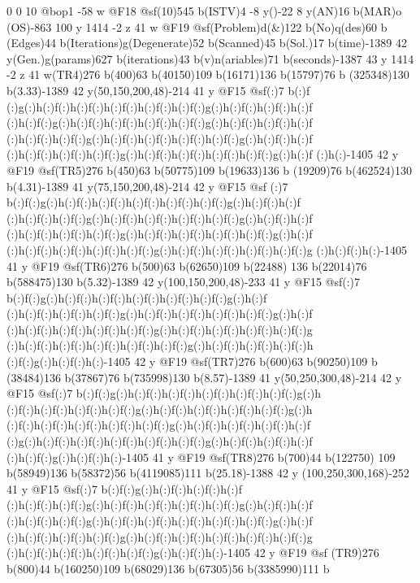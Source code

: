{{{{{{{{{{{{{{{{{{{{{{{{{{{{{{{{{{{{{{{{{{{{{{{{{{{{{{{{{{{{{{{{{{{{{0 0 10 @bop1 -58 w @F18 @sf(10)545 b(ISTV)4 -8 y()-22 8 y(AN)16 b(MAR)o
(OS)-863 100 y 1414 -2 z 41 w @F19 @sf(Problem)d(&)122 b(No)q(des)60 b
(Edges)44 b(Iterations)g(Degenerate)52 b(Scanned)45 b(Sol.)17 b(time)-1389 
42 y(Gen.)g(params)627 b(iterations)43 b(v)n(ariables)71 b(seconds)-1387 
43 y 1414 -2 z 41 w(TR4)276 b(400)63 b(40150)109 b(16171)136 b(15797)76 b
(325348)130 b(3.33)-1389 42 y(50,150,200,48)-214 41 y @F15 @sf(:)7 b(:)f
(:)g(:)h(:)f(:)h(:)f(:)h(:)f(:)h(:)f(:)h(:)f(:)g(:)h(:)f(:)h(:)f(:)h(:)f
(:)h(:)f(:)g(:)h(:)f(:)h(:)f(:)h(:)f(:)h(:)f(:)g(:)h(:)f(:)h(:)f(:)h(:)f
(:)h(:)f(:)h(:)f(:)g(:)h(:)f(:)h(:)f(:)h(:)f(:)h(:)f(:)g(:)h(:)f(:)h(:)f
(:)h(:)f(:)h(:)f(:)h(:)f(:)g(:)h(:)f(:)h(:)f(:)h(:)f(:)h(:)f(:)g(:)h(:)f
(:)h(:)-1405 42 y @F19 @sf(TR5)276 b(450)63 b(50775)109 b(19633)136 b
(19209)76 b(462524)130 b(4.31)-1389 41 y(75,150,200,48)-214 42 y @F15 @sf
(:)7 b(:)f(:)g(:)h(:)f(:)h(:)f(:)h(:)f(:)h(:)f(:)h(:)f(:)g(:)h(:)f(:)h(:)f
(:)h(:)f(:)h(:)f(:)g(:)h(:)f(:)h(:)f(:)h(:)f(:)h(:)f(:)g(:)h(:)f(:)h(:)f
(:)h(:)f(:)h(:)f(:)h(:)f(:)g(:)h(:)f(:)h(:)f(:)h(:)f(:)h(:)f(:)g(:)h(:)f
(:)h(:)f(:)h(:)f(:)h(:)f(:)h(:)f(:)g(:)h(:)f(:)h(:)f(:)h(:)f(:)h(:)f(:)g
(:)h(:)f(:)h(:)-1405 41 y @F19 @sf(TR6)276 b(500)63 b(62650)109 b(22488)
136 b(22014)76 b(588475)130 b(5.32)-1389 42 y(100,150,200,48)-233 41 y 
@F15 @sf(:)7 b(:)f(:)g(:)h(:)f(:)h(:)f(:)h(:)f(:)h(:)f(:)h(:)f(:)g(:)h(:)f
(:)h(:)f(:)h(:)f(:)h(:)f(:)g(:)h(:)f(:)h(:)f(:)h(:)f(:)h(:)f(:)g(:)h(:)f
(:)h(:)f(:)h(:)f(:)h(:)f(:)h(:)f(:)g(:)h(:)f(:)h(:)f(:)h(:)f(:)h(:)f(:)g
(:)h(:)f(:)h(:)f(:)h(:)f(:)h(:)f(:)h(:)f(:)g(:)h(:)f(:)h(:)f(:)h(:)f(:)h
(:)f(:)g(:)h(:)f(:)h(:)-1405 42 y @F19 @sf(TR7)276 b(600)63 b(90250)109 b
(38484)136 b(37867)76 b(735998)130 b(8.57)-1389 41 y(50,250,300,48)-214 
42 y @F15 @sf(:)7 b(:)f(:)g(:)h(:)f(:)h(:)f(:)h(:)f(:)h(:)f(:)h(:)f(:)g(:)h
(:)f(:)h(:)f(:)h(:)f(:)h(:)f(:)g(:)h(:)f(:)h(:)f(:)h(:)f(:)h(:)f(:)g(:)h
(:)f(:)h(:)f(:)h(:)f(:)h(:)f(:)h(:)f(:)g(:)h(:)f(:)h(:)f(:)h(:)f(:)h(:)f
(:)g(:)h(:)f(:)h(:)f(:)h(:)f(:)h(:)f(:)h(:)f(:)g(:)h(:)f(:)h(:)f(:)h(:)f
(:)h(:)f(:)g(:)h(:)f(:)h(:)-1405 41 y @F19 @sf(TR8)276 b(700)44 b(122750)
109 b(58949)136 b(58372)56 b(4119085)111 b(25.18)-1388 42 y
(100,250,300,168)-252 41 y @F15 @sf(:)7 b(:)f(:)g(:)h(:)f(:)h(:)f(:)h(:)f
(:)h(:)f(:)h(:)f(:)g(:)h(:)f(:)h(:)f(:)h(:)f(:)h(:)f(:)g(:)h(:)f(:)h(:)f
(:)h(:)f(:)h(:)f(:)g(:)h(:)f(:)h(:)f(:)h(:)f(:)h(:)f(:)h(:)f(:)g(:)h(:)f
(:)h(:)f(:)h(:)f(:)h(:)f(:)g(:)h(:)f(:)h(:)f(:)h(:)f(:)h(:)f(:)h(:)f(:)g
(:)h(:)f(:)h(:)f(:)h(:)f(:)h(:)f(:)g(:)h(:)f(:)h(:)-1405 42 y @F19 @sf
(TR9)276 b(800)44 b(160250)109 b(68029)136 b(67305)56 b(3385990)111 b
}}}}}}}}}}}}}}}}}}}}}}}}}}}}}}}}}}}}}}}}}}}}}}}}}}}}}}}}}}}}}}}}}}}}}
